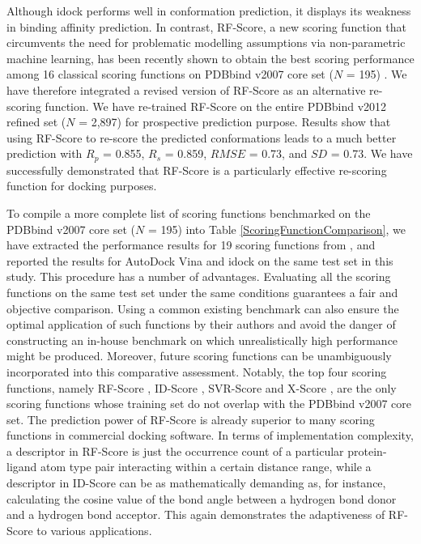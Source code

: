 \documentclass[10pt]{article}
\begin{document}
Although idock performs well in conformation prediction, it displays its weakness in binding affinity prediction. In contrast, RF-Score, a new scoring function that circumvents the need for problematic modelling assumptions via non-parametric machine learning, has been recently shown to obtain the best scoring performance among 16 classical scoring functions on PDBbind v2007 core set ($N$ = 195) \cite{564}. We have therefore integrated a revised version of RF-Score as an alternative re-scoring function. We have re-trained RF-Score on the entire PDBbind v2012 refined set ($N$ = 2,897) for prospective prediction purpose. Results show that using RF-Score to re-score the predicted conformations leads to a much better prediction with $R_p$ = 0.855, $R_s$ = 0.859, $RMSE$ = 0.73, and $SD$ = 0.73. We have successfully demonstrated that RF-Score is a particularly effective re-scoring function for docking purposes.

To compile a more complete list of scoring functions benchmarked on the PDBbind v2007 core set ($N$ = 195) into Table \ref{ScoringFunctionComparison}, we have extracted the performance results for 19 scoring functions from \cite{1313,564,1305,1295}, and reported the results for AutoDock Vina and idock on the same test set in this study. This procedure has a number of advantages. Evaluating all the scoring functions on the same test set under the same conditions guarantees a fair and objective comparison. Using a common existing benchmark can also ensure the optimal application of such functions by their authors and avoid the danger of constructing an in-house benchmark on which unrealistically high performance might be produced. Moreover, future scoring functions can be unambiguously incorporated into this comparative assessment. Notably, the top four scoring functions, namely RF-Score \cite{564}, ID-Score \cite{1305}, SVR-Score \cite{1295} and X-Score \cite{573}, are the only scoring functions whose training set do not overlap with the PDBbind v2007 core set. The prediction power of RF-Score is already superior to many scoring functions in commercial docking software. In terms of implementation complexity, a descriptor in RF-Score is just the occurrence count of a particular protein-ligand atom type pair interacting within a certain distance range, while a descriptor in ID-Score can be as mathematically demanding as, for instance, calculating the cosine value of the bond angle between a hydrogen bond donor and a hydrogen bond acceptor. This again demonstrates the adaptiveness of RF-Score to various applications.
\end{document}
